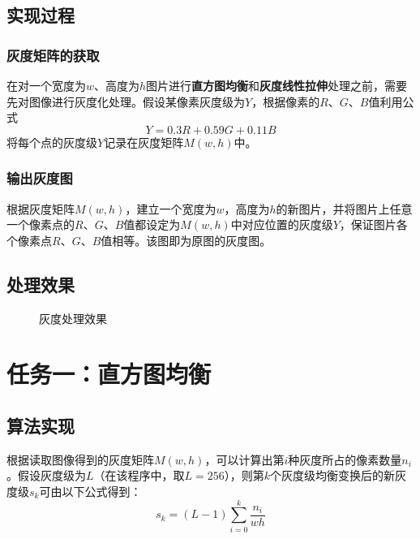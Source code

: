 \documentclass[UTF8]{ctexart}
\begin{document}
		\subsection{实现过程}
			\subsubsection{灰度矩阵的获取}
			在对一个宽度为$w$、高度为$h$图片进行\textbf{直方图均衡}和\textbf{灰度线性拉伸}处理之前，需要先对图像进行灰度化处理。假设某像素灰度级为$Y$，根据像素的$R$、$G$、$B$值利用公式
			\[ Y=0.3R+0.59G+0.11B \]
			将每个点的灰度级$Y$记录在灰度矩阵$M(w,h)$中。
			\subsubsection{输出灰度图}
			根据灰度矩阵$M(w,h)$，建立一个宽度为$w$，高度为$h$的新图片，并将图片上任意一个像素点的$R$、$G$、$B$值都设定为$M(w,h)$中对应位置的灰度级$Y$，保证图片各个像素点$R$、$G$、$B$值相等。该图即为原图的灰度图。
		\subsection{处理效果}

		\begin{figure}[H]
		\centering
		\caption{灰度处理效果}
		\end{figure}


	\section{任务一：直方图均衡}
		\subsection{算法实现}
		根据读取图像得到的灰度矩阵$M(w,h)$，可以计算出第$i$种灰度所占的像素数量$n_i$。假设灰度级为$L$（在该程序中，取$L=256$），则第$k$个灰度级均衡变换后的新灰度级$s_k$可由以下公式得到：
		\[ s_k=(L-1)\sum_{i=0}^k\frac{n_i}{wh} \]
\end{document}
